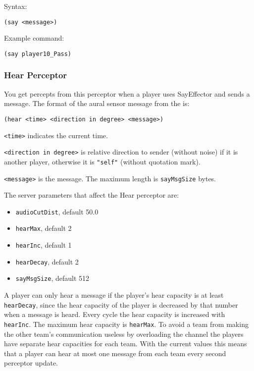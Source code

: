 Syntax: 
\begin{verbatim}
(say <message>)
\end{verbatim}

Example command:
\begin{verbatim}
(say player10_Pass)
\end{verbatim}

\subsubsection{Hear Perceptor}

You get percepts from this perceptor when a player uses SayEffector
and sends a message. The format of the aural sensor message from the
is:

\begin{verbatim}
(hear <time> <direction in degree> <message>)
\end{verbatim}

\texttt{<time>} indicates the current time.

\texttt{<direction in degree>} is relative direction to sender
(without noise) if it is another player, otherwise it is
\texttt{"self"} (without quotation mark).

\texttt{<message>} is the message. The maximum length is
\texttt{sayMsgSize} bytes.

The server parameters that affect the Hear perceptor are:


\begin{itemize}
\item \texttt{audioCutDist}, default 50.0
\item \texttt{hearMax}, default 2
\item \texttt{hearInc}, default 1
\item \texttt{hearDecay}, default 2
\item \texttt{sayMsgSize}, default 512
\end{itemize}

A player can only hear a message if the player's hear capacity is at
least \texttt{hearDecay}, since the hear capacity of the player is
decreased by that number when a message is heard. Every cycle the hear
capacity is increased with \texttt{hearInc}. The maximum hear capacity
is \texttt{hearMax}. To avoid a team from making the other team's
communication useless by overloading the channel the players have
separate hear capacities for each team. With the current values this
means that a player can hear at most one message from each team every
second perceptor update.


